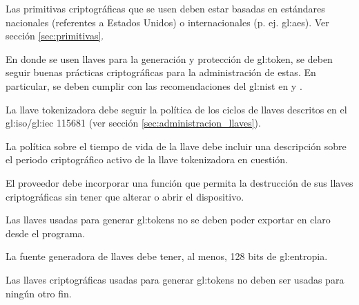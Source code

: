 {
  Las primitivas criptográficas que se usen deben estar basadas en
  estándares nacionales (referentes a Estados Unidos) o internacionales (p. ej.
  \gls{gl:aes}). Ver sección \ref{sec:primitivas}.
}



{
  En donde se usen llaves para la generación y protección de \gls{gl:token},
  se deben seguir buenas prácticas criptográficas para la administración de
  estas. En particular, se deben cumplir con las recomendaciones del
  \gls{gl:nist} en \cite{nist_llaves} y \cite{nist_disenio_llaves}.

  {
    La llave tokenizadora debe seguir la política de los ciclos de llaves
    descritos en el \acrshort{gl:iso}/\acrshort{gl:iec} 115681 (ver
    sección \ref{sec:administracion_llaves}).
  }

  {
    La política sobre el tiempo de vida de la llave debe incluir una
    descripción sobre el periodo criptográfico activo de la llave
    tokenizadora en cuestión.
  }

  {
   	El proveedor debe incorporar una función que permita la destrucción
   	de sus llaves criptográficas sin tener que alterar o abrir el
   	dispositivo.
  }

  {
    Las llaves usadas para generar \glspl{gl:token} no se deben poder
    exportar en claro desde el programa.
  }

  {
    La fuente generadora de llaves debe tener, al menos, 128 bits de
    \gls{gl:entropia}.
  }

  {
    Las llaves criptográficas usadas para generar \glspl{gl:token} no
    deben ser usadas para ningún otro fin.
  }
}


